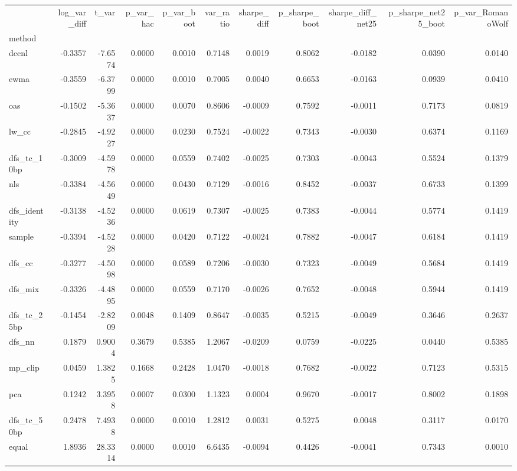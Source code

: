 \begin{tabular}{lrrrrrrrrrr}
\toprule
 & log_var_diff & t_var & p_var_hac & p_var_boot & var_ratio & sharpe_diff & p_sharpe_boot & sharpe_diff_net25 & p_sharpe_net25_boot & p_var_RomanoWolf \\
method &  &  &  &  &  &  &  &  &  &  \\
\midrule
dccnl & -0.3357 & -7.6574 & 0.0000 & 0.0010 & 0.7148 & 0.0019 & 0.8062 & -0.0182 & 0.0390 & 0.0140 \\
ewma & -0.3559 & -6.3799 & 0.0000 & 0.0010 & 0.7005 & 0.0040 & 0.6653 & -0.0163 & 0.0939 & 0.0410 \\
oas & -0.1502 & -5.3637 & 0.0000 & 0.0070 & 0.8606 & -0.0009 & 0.7592 & -0.0011 & 0.7173 & 0.0819 \\
lw_cc & -0.2845 & -4.9227 & 0.0000 & 0.0230 & 0.7524 & -0.0022 & 0.7343 & -0.0030 & 0.6374 & 0.1169 \\
dfs_tc_10bp & -0.3009 & -4.5978 & 0.0000 & 0.0559 & 0.7402 & -0.0025 & 0.7303 & -0.0043 & 0.5524 & 0.1379 \\
nls & -0.3384 & -4.5649 & 0.0000 & 0.0430 & 0.7129 & -0.0016 & 0.8452 & -0.0037 & 0.6733 & 0.1399 \\
dfs_identity & -0.3138 & -4.5236 & 0.0000 & 0.0619 & 0.7307 & -0.0025 & 0.7383 & -0.0044 & 0.5774 & 0.1419 \\
sample & -0.3394 & -4.5228 & 0.0000 & 0.0420 & 0.7122 & -0.0024 & 0.7882 & -0.0047 & 0.6184 & 0.1419 \\
dfs_cc & -0.3277 & -4.5098 & 0.0000 & 0.0589 & 0.7206 & -0.0030 & 0.7323 & -0.0049 & 0.5684 & 0.1419 \\
dfs_mix & -0.3326 & -4.4895 & 0.0000 & 0.0559 & 0.7170 & -0.0026 & 0.7652 & -0.0048 & 0.5944 & 0.1419 \\
dfs_tc_25bp & -0.1454 & -2.8209 & 0.0048 & 0.1409 & 0.8647 & -0.0035 & 0.5215 & -0.0049 & 0.3646 & 0.2637 \\
dfs_nn & 0.1879 & 0.9004 & 0.3679 & 0.5385 & 1.2067 & -0.0209 & 0.0759 & -0.0225 & 0.0440 & 0.5385 \\
mp_clip & 0.0459 & 1.3825 & 0.1668 & 0.2428 & 1.0470 & -0.0018 & 0.7682 & -0.0022 & 0.7123 & 0.5315 \\
pca & 0.1242 & 3.3958 & 0.0007 & 0.0300 & 1.1323 & 0.0004 & 0.9670 & -0.0017 & 0.8002 & 0.1898 \\
dfs_tc_50bp & 0.2478 & 7.4938 & 0.0000 & 0.0010 & 1.2812 & 0.0031 & 0.5275 & 0.0048 & 0.3117 & 0.0170 \\
equal & 1.8936 & 28.3314 & 0.0000 & 0.0010 & 6.6435 & -0.0094 & 0.4426 & -0.0041 & 0.7343 & 0.0010 \\
\bottomrule
\end{tabular}
